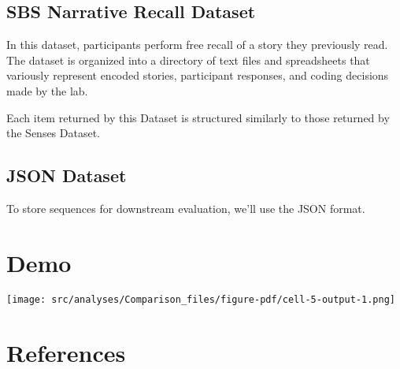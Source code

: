 \documentclass[
  letterpaper,
  DIV=11,
  numbers=noendperiod]{scrreprt}
\begin{document}
\hypertarget{sbs-narrative-recall-dataset}{%
\section{SBS Narrative Recall
Dataset}\label{sbs-narrative-recall-dataset}}

In this dataset, participants perform free recall of a story they
previously read. The dataset is organized into a directory of text files
and spreadsheets that variously represent encoded stories, participant
responses, and coding decisions made by the lab.

Each item returned by this Dataset is structured similarly to those
returned by the Senses Dataset.

\hypertarget{json-dataset}{%
\section{JSON Dataset}\label{json-dataset}}

To store sequences for downstream evaluation, we'll use the JSON format.


\hypertarget{demo}{%
\chapter{Demo}\label{demo}}

\texttt{[image: src/analyses/Comparison\_files/figure-pdf/cell-5-output-1.png]}


\hypertarget{references}{%
\chapter{References}\label{references}}
\end{document}
